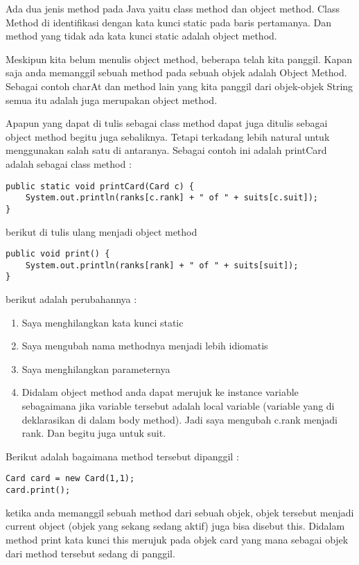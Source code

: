 Ada dua jenis method pada Java yaitu class method dan object method. Class Method di identifikasi dengan kata kunci static pada baris pertamanya. Dan method yang tidak ada kata kunci static adalah object method.

Meskipun kita belum menulis object method, beberapa telah kita panggil. Kapan saja anda memanggil sebuah method pada sebuah objek adalah Object Method. Sebagai contoh charAt dan method lain yang kita panggil dari objek-objek String semua itu adalah juga merupakan object method. 

Apapun yang dapat di tulis sebagai class method dapat juga ditulis sebagai object method begitu juga sebaliknya. Tetapi terkadang lebih natural untuk menggunakan salah satu di antaranya.
Sebagai contoh ini adalah printCard adalah sebagai class method :

\begin{lstlisting}
public static void printCard(Card c) {
	System.out.println(ranks[c.rank] + " of " + suits[c.suit]);
}
\end{lstlisting}

berikut di tulis ulang menjadi object method 

\begin{lstlisting}
public void print() {
	System.out.println(ranks[rank] + " of " + suits[suit]);
}
\end{lstlisting}

berikut adalah perubahannya :
\begin{enumerate}
	\item Saya menghilangkan kata kunci static
	\item Saya mengubah nama methodnya menjadi lebih idiomatis
	\item Saya menghilangkan parameternya
	\item Didalam object method anda dapat merujuk ke instance variable sebagaimana jika variable tersebut adalah local variable (variable yang di deklarasikan di dalam body method). Jadi saya mengubah c.rank menjadi rank. Dan begitu juga untuk suit.
\end{enumerate}

Berikut adalah bagaimana method tersebut dipanggil :
\begin{lstlisting}
Card card = new Card(1,1);
card.print();
\end{lstlisting}

ketika anda memanggil sebuah method dari sebuah objek, objek tersebut menjadi current object (objek yang sekang sedang aktif) juga bisa disebut this. Didalam method print kata kunci this merujuk pada objek card yang mana sebagai objek dari method tersebut sedang di panggil.

